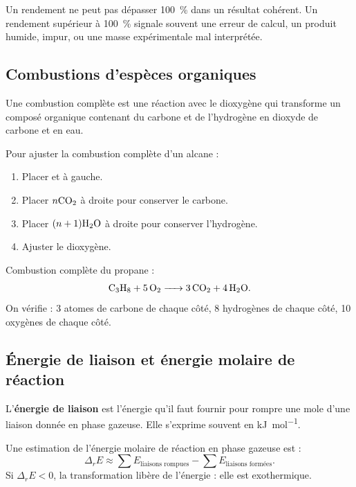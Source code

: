 \documentclass[11pt,a4paper]{article}
\begin{document}
\begin{erreurbox}
Un rendement ne peut pas dépasser \SI{100}{\percent} dans un résultat cohérent. Un rendement supérieur à \SI{100}{\percent} signale souvent une erreur de calcul, un produit humide, impur, ou une masse expérimentale mal interprétée.
\end{erreurbox}

\subsection{Combustions d'espèces organiques}

\begin{definitionbox}
Une combustion complète est une réaction avec le dioxygène qui transforme un composé organique contenant du carbone et de l'hydrogène en dioxyde de carbone et en eau.
\end{definitionbox}

\begin{methodbox}
Pour ajuster la combustion complète d'un alcane  :
\begin{enumerate}
\item Placer  et  à gauche.
\item Placer $n\ce{CO2}$ à droite pour conserver le carbone.
\item Placer $(n+1)\ce{H2O}$ à droite pour conserver l'hydrogène.
\item Ajuster le dioxygène.
\end{enumerate}
\end{methodbox}

\begin{exemplebox}
Combustion complète du propane :
\[
\ce{C3H8 + 5O2 -> 3CO2 + 4H2O}.
\]
On vérifie : 3 atomes de carbone de chaque côté, 8 hydrogènes de chaque côté, 10 oxygènes de chaque côté.
\end{exemplebox}

\subsection{Énergie de liaison et énergie molaire de réaction}

\begin{definitionbox}
L'\textbf{énergie de liaison} est l'énergie qu'il faut fournir pour rompre une mole d'une liaison donnée en phase gazeuse. Elle s'exprime souvent en \si{kJ.mol^{-1}}.
\end{definitionbox}

\begin{theorembox}
Une estimation de l'énergie molaire de réaction en phase gazeuse est :
\[
\Delta_r E \approx \sum E_{\text{liaisons rompues}}-\sum E_{\text{liaisons formées}}.
\]
Si $\Delta_rE<0$, la transformation libère de l'énergie : elle est exothermique.
\end{theorembox}
\end{document}
